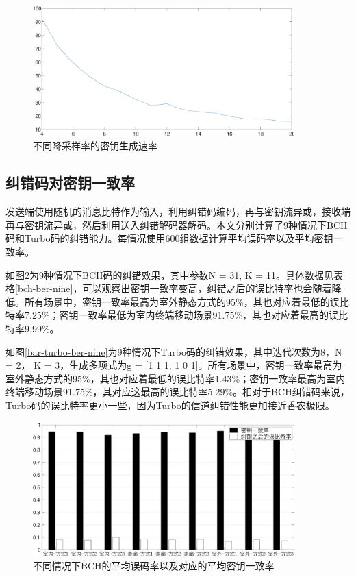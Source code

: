 \documentclass[master]{seuthesis} %
\begin{document}
\begin{Main}
\begin{figure}[htbp!]
    \centering \includegraphics[width=0.9\textwidth]{images/keyrate.eps}
    \caption{不同降采样率的密钥生成速率}
    \label{keyrate}
\end{figure}


\subsection{纠错码对密钥一致率}

发送端使用随机的消息比特作为输入，利用纠错码编码，再与密钥流异或，接收端再与密钥流异或，然后利用送入纠错解码器解码。本文分别计算了9种情况下BCH码和Turbo码的纠错能力。每情况使用600组数据计算平均误码率以及平均密钥一致率。

如图\ref{bar-bch-ber-nine}为9种情况下BCH码的纠错效果，其中参数N = 31, K = 11。具体数据见表格\ref{bch-ber-nine}，可以观察出密钥一致率变高，纠错之后的误比特率也会随着降低。所有场景中，密钥一致率最高为室外静态方式的95\%，其也对应着最低的误比特率7.25\%；密钥一致率最低为室内终端移动场景91.75\%，其也对应着最高的误比特率9.99\%。

如图\ref{bar-turbo-ber-nine}为9种情况下Turbo码的纠错效果，其中迭代次数为8，N = 2， K = 3，生成多项式为g = [1 1 1; 1 0 1]。所有场景中，密钥一致率最高为室外静态方式的95\%，其也对应着最低的误比特率1.43\%；密钥一致率最高为室内终端移动场景91.75\%，其对应这最高的误比特率5.29\%。相对于BCH纠错码来说，Turbo码的误比特率更小一些，因为Turbo的信道纠错性能更加接近香农极限。

\begin{figure}[htbp!]
    \centering \includegraphics[width=0.9\textwidth]{images/tdd-encode/bch-ber-nine.eps}
    \caption{不同情况下BCH的平均误码率以及对应的平均密钥一致率}
    \label{bar-bch-ber-nine}
\end{figure}


\end{Main}
\end{document}
